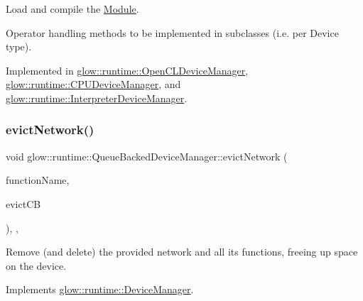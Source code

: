 Load and compile the \hyperlink{classglow_1_1_module}{Module}. 

Operator handling methods to be implemented in subclasses (i.\+e. per Device type). 

Implemented in \hyperlink{classglow_1_1runtime_1_1_open_c_l_device_manager_a062d49988e839e94d4b56ef18851d0f2}{glow\+::runtime\+::\+Open\+C\+L\+Device\+Manager}, \hyperlink{classglow_1_1runtime_1_1_c_p_u_device_manager_a00e9a9c52e5f56bb5844af7b2e0e682e}{glow\+::runtime\+::\+C\+P\+U\+Device\+Manager}, and \hyperlink{classglow_1_1runtime_1_1_interpreter_device_manager_acb6a52ac1d6b704796f52da6c26d2774}{glow\+::runtime\+::\+Interpreter\+Device\+Manager}.

\mbox{\label{classglow_1_1runtime_1_1_queue_backed_device_manager_abbccad8e2a9b082eb6c5865352c67ef8}} 
\subsubsection{\texorpdfstring{evict\+Network()}{evictNetwork()}}
{\footnotesize\ttfamily void glow\+::runtime\+::\+Queue\+Backed\+Device\+Manager\+::evict\+Network (\begin{DoxyParamCaption}\item[{std\+::string}]{function\+Name,  }\item[{Evict\+Function\+C\+B\+Ty}]{evict\+CB }\end{DoxyParamCaption})\hspace{0.3cm}{\ttfamily [inline]}, {\ttfamily [override]}, {\ttfamily [virtual]}}

Remove (and delete) the provided network and all it\textquotesingle{}s functions, freeing up space on the device. 

Implements \hyperlink{classglow_1_1runtime_1_1_device_manager_a147c76a007db17659c1962c1fa864f9a}{glow\+::runtime\+::\+Device\+Manager}.

\mbox{\label{classglow_1_1runtime_1_1_queue_backed_device_manager_a46bdff62e862da50435f4744a3587f1a}} 

